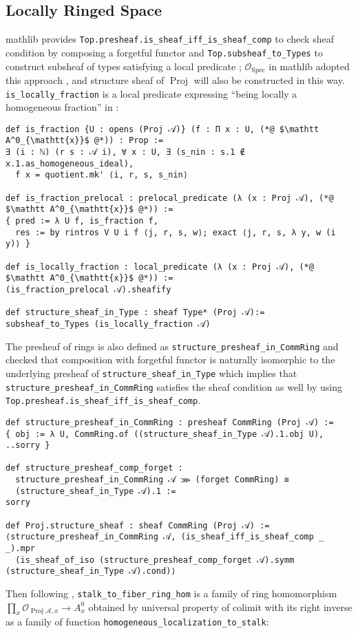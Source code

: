 \documentclass[a4paper,UKenglish,cleveref, autoref, thm-restate]{lipics-v2021}
\begin{document}
\subsection{Locally Ringed Space}
\textsf{mathlib} provides \lstinline{Top.presheaf.is_sheaf_iff_is_sheaf_comp} to check sheaf condition by composing a forgetful functor and \lstinline{Top.subsheaf_to_Types} to construct subsheaf of types satisfying a local predicate \cite{docsmathlib}; $\mathcal{O}_{\operatorname{Spec}}$ in \textsf{mathlib} adopted this approach \cite{mathlibrepo}, and structure sheaf of $\operatorname{Proj}$ will also be constructed in this way. \lstinline{is_locally_fraction} is a local predicate expressing ``being locally a homogeneous fraction'' in :

\begin{lstlisting}
def is_fraction {U : opens (Proj 𝒜)} (f : Π x : U, (*@ $\mathtt A^0_{\mathtt{x}}$ @*)) : Prop :=
∃ (i : ℕ) (r s : 𝒜 i), ∀ x : U, ∃ (s_nin : s.1 ∉ x.1.as_homogeneous_ideal),
  f x = quotient.mk' ⟨i, r, s, s_nin⟩

def is_fraction_prelocal : prelocal_predicate (λ (x : Proj 𝒜), (*@ $\mathtt A^0_{\mathtt{x}}$ @*)) :=
{ pred := λ U f, is_fraction f,
  res := by rintros V U i f ⟨j, r, s, w⟩; exact ⟨j, r, s, λ y, w (i y)⟩ }

def is_locally_fraction : local_predicate (λ (x : Proj 𝒜), (*@ $\mathtt A^0_{\mathtt{x}}$ @*)) :=
(is_fraction_prelocal 𝒜).sheafify

def structure_sheaf_in_Type : sheaf Type* (Proj 𝒜):=
subsheaf_to_Types (is_locally_fraction 𝒜)
\end{lstlisting}

The presheaf of rings is also defined as \lstinline{structure_presheaf_in_CommRing} and checked that composition with forgetful functor is naturally isomorphic to the underlying presheaf of \lstinline{structure_sheaf_in_Type} which implies that \lstinline{structure_presheaf_in_CommRing} satisfies the sheaf condition as well by using \lstinline{Top.presheaf.is_sheaf_iff_is_sheaf_comp}.
\begin{lstlisting}
def structure_presheaf_in_CommRing : presheaf CommRing (Proj 𝒜) :=
{ obj := λ U, CommRing.of ((structure_sheaf_in_Type 𝒜).1.obj U), ..sorry }

def structure_presheaf_comp_forget :
  structure_presheaf_in_CommRing 𝒜 ⋙ (forget CommRing) ≅ 
  (structure_sheaf_in_Type 𝒜).1 := 
sorry

def Proj.structure_sheaf : sheaf CommRing (Proj 𝒜) :=
⟨structure_presheaf_in_CommRing 𝒜, (is_sheaf_iff_is_sheaf_comp _ _).mpr
  (is_sheaf_of_iso (structure_presheaf_comp_forget 𝒜).symm (structure_sheaf_in_Type 𝒜).cond)⟩
\end{lstlisting}
Then following , \lstinline{stalk_to_fiber_ring_hom} is a family of ring homomorphism $\prod_x \mathcal{O}_{\operatorname{Proj}\mathcal A, x}\to A^0_x$ obtained by universal property of colimit with its right inverse as a family of function \lstinline{homogeneous_localization_to_stalk}:
\end{document}
